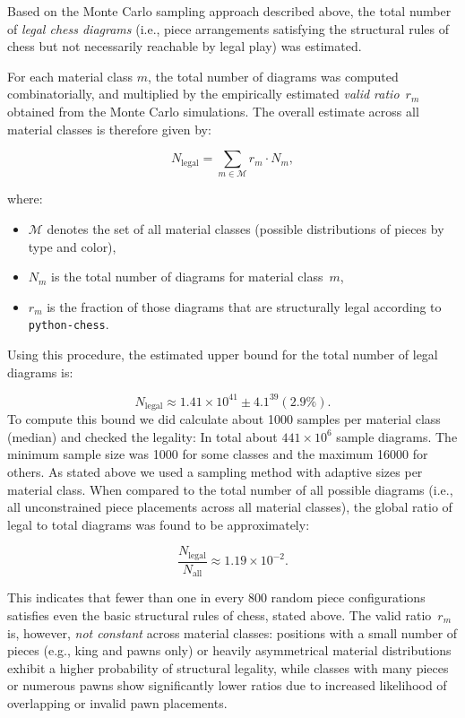 \documentclass[12pt]{article}
\begin{document}
Based on the Monte Carlo sampling approach described above, the total number of \emph{legal chess diagrams} (i.e., piece arrangements satisfying the structural rules of chess but not necessarily reachable by legal play) was estimated.

For each material class $m$, the total number of diagrams was computed combinatorially, and multiplied by the empirically estimated \emph{valid ratio}~$r_m$ obtained from the Monte Carlo simulations.  
The overall estimate across all material classes is therefore given by:

\[
N_{\text{legal}} = \sum_{m \in \mathcal{M}} r_m \cdot N_m,
\]

where:
\begin{itemize}
    \item $\mathcal{M}$ denotes the set of all material classes (possible distributions of pieces by type and color),
    \item $N_m$ is the total number of diagrams for material class~$m$,
    \item $r_m$ is the fraction of those diagrams that are structurally legal according to \texttt{python-chess}.
\end{itemize}

Using this procedure, the estimated upper bound for the total number of legal diagrams is:

\[
N_{\text{legal}} \approx 1.41 \times 10^{41}\pm4.1^{39} (2.9\%).
\]
To compute this bound we did calculate about 1000 samples per material class (median) and checked the legality: In total about $441\times 10^{6}$ sample diagrams. The minimum sample size was 1000 for some classes and the maximum 16000 for others. As stated above we used a sampling method with adaptive sizes per material class.
\noindent
When compared to the total number of all possible diagrams (i.e., all unconstrained piece placements across all material classes), the global ratio of legal to total diagrams was found to be approximately:

\[
\frac{N_{\text{legal}}}{N_{\text{all}}} \approx 1.19\times 10^{-2}.
\]

This indicates that fewer than one in every 800 random piece configurations satisfies even the basic structural rules of chess, stated above.
The valid ratio~$r_m$ is, however, \emph{not constant} across material classes: positions with a small number of pieces (e.g., king and pawns only) or heavily asymmetrical material distributions exhibit a higher probability of structural legality, while classes with many pieces or numerous pawns show significantly lower ratios due to increased likelihood of overlapping or invalid pawn placements.
\end{document}
